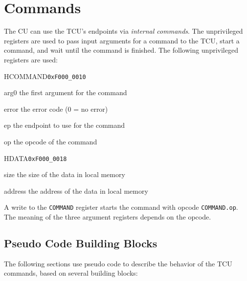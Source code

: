 \documentclass[a4paper,11pt,draft]{article}
\begin{document}
\section{Commands}

The CU can use the TCU's endpoints via \emph{internal commands}. The unprivileged registers are used
to pass input arguments for a command to the TCU, start a command, and wait until the command is
finished. The following unprivileged registers are used:

\begin{register}{H}{COMMAND}{\texttt{0xF000\_0010}}
  \regnewline%
  \begin{regdesc}\begin{reglist}
    \item[arg0] the first argument for the command
    \item[error] the error code (0 = no error)
    \item[ep] the endpoint to use for the command
    \item[op] the opcode of the command
  \end{reglist}\end{regdesc}
\end{register}

\begin{register}{H}{DATA}{\texttt{0xF000\_0018}}
  \regnewline%
  \begin{regdesc}\begin{reglist}
    \item[size] the size of the data in local memory
    \item[address] the address of the data in local memory
  \end{reglist}\end{regdesc}
\end{register}

\noindent A write to the \texttt{COMMAND} register starts the command with opcode
\texttt{COMMAND.op}. The meaning of the three argument registers depends on the opcode.

\subsection{Pseudo Code Building Blocks}

The following sections use pseudo code to describe the behavior of the TCU commands, based on
several building blocks:
\end{document}
